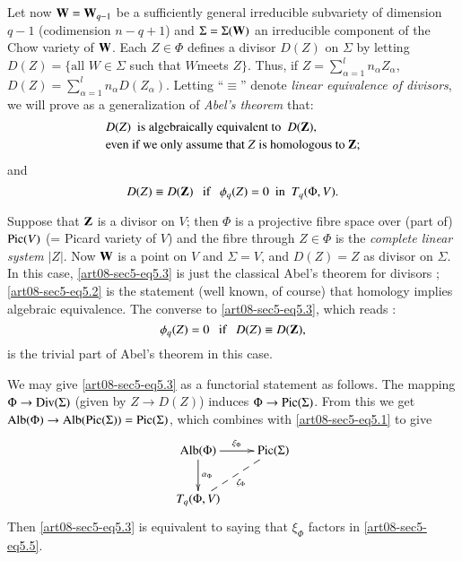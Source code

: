 Let now $\mathbf{W}=\mathbf{W}_{q-1}$ be a sufficiently general irreducible subvariety of dimension $q-1$ (codimension $n-q+1$) and $\Sigma=\Sigma(\mathbf{W})$ an irreducible component of the Chow variety of $\mathbf{W}$. Each $Z\in \Phi$ defines a divisor $D(Z)$ on $\Sigma$ by letting $D(Z)=\{\text{all~}W\in \Sigma$ such that $W$\pageoriginale meets $Z\}$. Thus, if $Z=\sum\limits^{l}_{\alpha=1}n_{\alpha}Z_{\alpha}$, $D(Z)=\sum\limits^{l}_{\alpha=1}n_{\alpha}D(Z_{\alpha})$. Letting ``$\equiv$'' denote {\em linear equivalence of divisors}, we will prove as a generalization of {\em Abel's theorem} that:
\begin{equation}
\begin{array}{l}
D(Z)\text{~ is algebraically equivalent to~ } D(\mathbf{Z}),\\[2pt]
\text{even if we only assume that $Z$ is homologous to $\mathbf{Z}$};
\end{array}\label{art08-sec5-eq5.2}
\end{equation}
and
\begin{equation}
D(Z)\equiv D(\mathbf{Z})\text{~~ if~~ }\phi_{q}(Z)=0\text{~ in~ }T_{q}(\Phi,V).\label{art08-sec5-eq5.3}
\end{equation}

\setcounter{definition}{0}
\begin{example}\label{art08-sec5-exam1}
Suppose that $\mathbf{Z}$ is a divisor on $V$; then $\Phi$ is a projective fibre space over (part of) $\operatorname{\mathrm{Pic}}(V)$ (= Picard variety of $V$) and the fibre through $Z\in \Phi$ is the {\em complete linear system} $|Z|$. Now $\mathbf{W}$ is a point on $V$ and $\Sigma=V$, and $D(Z)=Z$ as divisor on $\Sigma$. In this case, \eqref{art08-sec5-eq5.3} is just the classical Abel's theorem for divisors \cite{art08-key17}; \eqref{art08-sec5-eq5.2} is the statement (well known, of course) that homology implies algebraic equivalence. The converse to \eqref{art08-sec5-eq5.3}, which reads :
\begin{equation}
\phi_{q}(Z)=0\text{~~ if~~ } D(Z)\equiv D(\mathbf{Z}),\label{art08-sec5-eq5.4}
\end{equation}
is the trivial part of Abel's theorem in this case.
\end{example}

\begin{remark*}
We may give \eqref{art08-sec5-eq5.3} as a functorial statement as follows. The mapping $\Phi\to \operatorname{\mathrm{Div}}(\Sigma)$ (given by $Z\to D(Z)$) induces $\Phi\to \operatorname{\mathrm{Pic}}(\Sigma)$. From this we get $\operatorname{\mathrm{Alb}}(\Phi)\to \operatorname{\mathrm{Alb}}(\operatorname{\mathrm{Pic}}(\Sigma))=\operatorname{\mathrm{Pic}}(\Sigma)$, which combines with \eqref{art08-sec5-eq5.1} to give
\begin{equation}
\vcenter{\xymatrix{
\Alb(\Phi)\ar[d]^-{\alpha_{\Phi}}\ar[r]^-{\xi_{\Phi}} & \Pic(\Sigma)\\
T_{q}(\Phi,V)\ar@{--}[ur]_{\zeta_{\Phi}} &
}}\label{art08-sec5-eq5.5}
\end{equation}
Then \eqref{art08-sec5-eq5.3} is equivalent to saying that $\xi_{\Phi}$ factors in \eqref{art08-sec5-eq5.5}.
\end{remark*}

